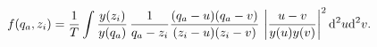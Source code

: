 \begin{equation} f(q_a,z_i)   =  { 1\over   T} \int  {
y(z_i)\over y(q_a) } \, { 1\over q_a - z_i}    { (q_a-u)(q_a-v)
\over (z_i-u)(z_i-v) } \, \left| u-v \over y(u)y(v) \right|^2 {\rm
d}^2 u{\rm d}^2 v .
\end{equation}

